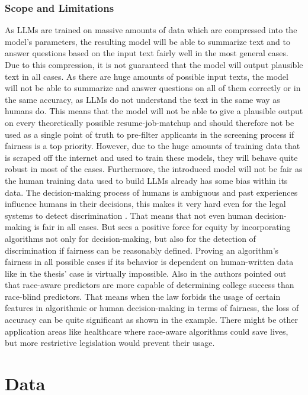 \documentclass[draft,final]{thesisclass} %
\begin{document}
\subsection{Scope and Limitations}
As \acs{LLM}s are trained on massive amounts of data which are compressed into the model's parameters, the resulting model will be able to summarize text and to answer questions based on the input text fairly well in the most general cases.
Due to this compression, it is not guaranteed that the model will output plausible text in all cases. 
As there are huge amounts of possible input texts, the model will not be able to summarize and answer questions on all of them correctly or in the same accuracy, as \acs{LLM}s do not understand the text in the same way as humans do.
This means that the model will not be able to give a plausible output on every theoretically possible resume-job-matchup and should therefore not be used as a single point of truth to pre-filter applicants in the screening process if fairness is a top priority.
However, due to the huge amounts of training data that is scraped off the internet and used to train these models, they will behave quite robust in most of the cases.
Furthermore, the introduced model will not be fair as the human training data used to build \acs{LLM}s already has some bias within its data. The decision-making process of humans is ambiguous and past experiences influence humans in their decisions, this makes it very hard even for the legal systems to detect discrimination \cite[113]{discrimination_algorithms}. That means that not even human decision-making is fair in all cases. But \cite[113]{discrimination_algorithms} sees a positive force for equity by incorporating algorithms not only for decision-making, but also for the detection of discrimination if fairness can be reasonably defined. Proving an algorithm's fairness in all possible cases if its behavior is dependent on human-written data like in the thesis' case is virtually impossible. Also in \cite[158-160]{discrimination_algorithms} the authors pointed out that race-aware predictors are more capable of determining college success than race-blind predictors.
That means when the law forbids the usage of certain features in algorithmic or human decision-making in terms of fairness, the loss of accuracy can be quite significant as shown in the example. There might be other application areas like healthcare where race-aware algorithms could save lives, but more restrictive legislation would prevent their usage.

\chapter{Data}
\end{document}
